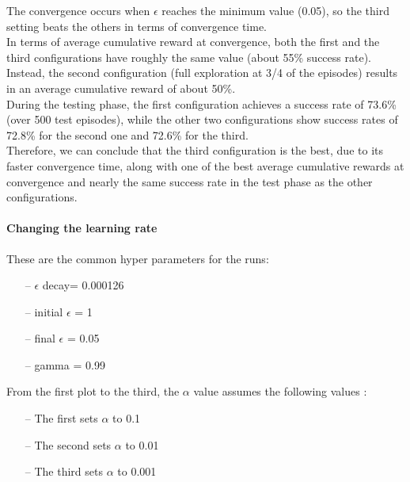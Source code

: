 \documentclass{article}
\begin{document}
\clearpage


The convergence occurs when $\epsilon$ reaches the minimum value (0.05), so the third setting beats the others in terms of convergence time.
\\
In terms of average cumulative reward at convergence, both the first and the third configurations have roughly the same value (about 55\% success rate). Instead, the second configuration (full exploration at 3/4 of the episodes) results in an average cumulative reward of about 50\%.
\\
During the testing phase, the first configuration achieves a success rate of 73.6\% (over 500 test episodes), while the other two configurations show success rates of 72.8\% for the second one and 72.6\% for the third.
\\
Therefore, we can conclude that the third configuration is the best, due to its faster convergence time, along with one of the best average cumulative rewards at convergence and nearly the same success rate in the test phase as the other configurations.


\paragraph{Changing the learning rate}

These are the common hyper parameters for the runs:
\begin{itemize}
\item[--] $\epsilon$ decay= 0.000126
\item[--] initial $\epsilon$ = 1
\item[--] final $\epsilon$ = 0.05
\item[--] gamma = 0.99
\end{itemize}

From the first plot to the third, the $\alpha$ value assumes the following values :
\begin{itemize}
\item[--] The first sets $\alpha$ to 0.1
\item[--] The second sets $\alpha$ to 0.01
\item[--] The third sets $\alpha$ to 0.001
\end{itemize}

\clearpage


\begin{center}
\centering
{}
\end{center}
\end{document}
